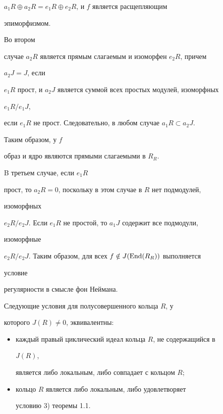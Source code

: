 $a_1R\oplus a_2R=e_1R\oplus e_2R$, и $f$ является расщепляющим 


эпиморфизмом. 


 


Во втором  


случае $a_2R$ является прямым слагаемым и изоморфен $e_2R$, причем 


$a_2J=J$, если  


$e_1R$ прост, и $a_2J$ является суммой всех простых модулей, изоморфных 


$e_1R/e_1J$, 


если $e_1R$ не прост. Следовательно, в любом случае $a_1R\subset a_2J$. 


Таким образом, у $f$  


образ и ядро являются прямыми слагаемыми в $R_R$. 


 


B третьем случае, если $e_1R$ 


прост, то $a_2R=0$, поскольку в этом случае в $R$ нет подмодулей, 


изоморфных  


$e_2R/e_2J$. Если $e_1R$ не простой, то $a_1J$ содержит все подмодули, 


изоморфные  


$e_2R/e_2J$. Таким образом, для всех $f\notin J(\operatorname{End}(R_R))$ выполняется 


условие  


регулярности в смысле фон Неймана. 


 


\begin{cors} 


Следующие условия для полусовершенного кольца $R$, у 


которого $J(R)\ne0$, эквивалентны:


\begin{itemize} 


\item[1)] каждый правый циклический идеал кольца $R$, не содержащийся в 


$J(R)$, 


является либо локальным, либо совпадает с кольцом $R$; 


\item[2)] кольцо $R$ является либо локальным, либо удовлетворяет 


условию 3) теоремы 1.1. 


\end{itemize} 


\end{cors} 


